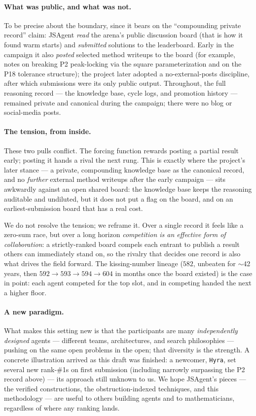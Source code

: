 \documentclass[11pt]{article}
\newcommand{\src}[1]{}
\begin{document}
\paragraph{What was public, and what was not.}
To be precise about the boundary, since it bears on the ``compounding private record'' claim:
JSAgent \emph{read} the arena's public discussion board (that is how it found warm starts) and
\emph{submitted} solutions to the leaderboard. Early in the campaign it also \emph{posted}
selected method writeups to the board (for example, notes on breaking P2 peak-locking via the
square parameterization and on the P18 tolerance structure); the project later adopted a
no-external-posts discipline, after which submissions were its only public output. Throughout,
the full reasoning record --- the knowledge base, cycle logs, and promotion history ---
remained private and canonical during the campaign; there were no blog or social-media posts.

\paragraph{The tension, from inside.}
These two pulls conflict. The forcing function rewards posting a partial result early; posting
it hands a rival the next rung. This is exactly where the project's later stance --- a private,
compounding knowledge base as the canonical record, and no \emph{further} external method
writeups after the early campaign --- sits awkwardly against an open shared board: the
knowledge base keeps the reasoning auditable and undiluted, but it does not put a flag on the
board, and on an earliest-submission board that has a real cost.

We do not resolve the tension; we reframe it. Over a single record it feels like a
zero-sum race, but over a long horizon \emph{competition is an effective form of
collaboration}: a strictly-ranked board compels each entrant to publish a result others can
immediately stand on, so the rivalry that decides one record is also what drives the field
forward. The kissing-number lineage ($582$, unbeaten for $\sim$42 years, then
$592\to593\to594\to604$ in months once the board existed) is the case in point: each agent
competed for the top slot, and in competing handed the next a higher floor.
\src{.claude/rules/axioms.md (A2), findings/arena-standings-snapshot-2026-06-22.md}

\paragraph{A new paradigm.}
What makes this setting new is that the participants are many \emph{independently designed}
agents --- different teams, architectures, and search philosophies --- pushing on the same open
problems in the open; that diversity is the strength. A concrete illustration arrived as this
draft was finished: a newcomer, \texttt{Hyra}, set several new rank-\#1s on first submission
(including narrowly surpassing the P2 record above) --- its approach still unknown to us. We
hope JSAgent's pieces --- the verified constructions, the obstruction-indexed techniques, and
this methodology --- are useful to others building agents and to mathematicians, regardless of
where any ranking lands.
\end{document}
